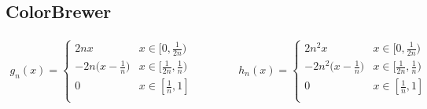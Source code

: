 \documentclass{article}
\theoremstyle{definition}
\theoremstyle{definition}
\theoremstyle{remark}
\begin{document}
\subsection{ColorBrewer}

\begin{align*}
    g_n(x)=\begin{cases}
        2nx&x\in[0,\frac{1}{2n})\\
        -2n\bigl(x-\frac{1}{n}\bigr)&x\in[\frac{1}{2n},\frac{1}{n})\\
        0&x\in[\frac{1}{n},1]\\
    \end{cases}\qquad\qquad
    h_n(x)=\begin{cases}
        2n^2x&x\in[0,\frac{1}{2n})\\
        -2n^2\bigl(x-\frac{1}{n}\bigr)&x\in[\frac{1}{2n},\frac{1}{n})\\
        0&x\in[\frac{1}{n},1]\\
    \end{cases}
\end{align*}
\end{document}

